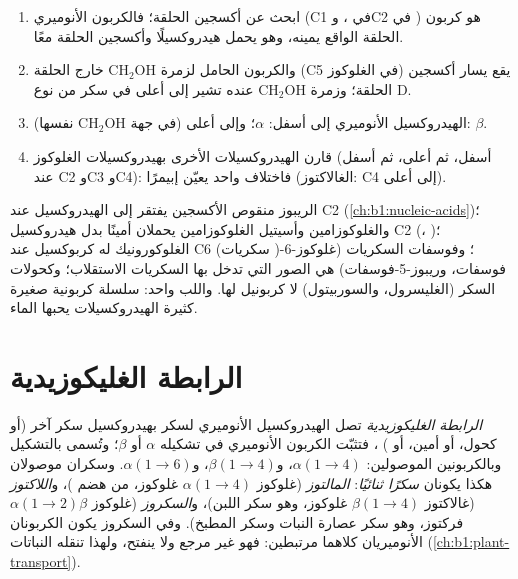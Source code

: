 \begin{method}\label{met:b1:carbohydrates:haworth}
\begin{enumerate}
  \item ابحث عن أكسجين الحلقة؛ فالكربون الأنوميري (C1 في ،
        وC2 في ) هو كربون الحلقة الواقع يمينه، وهو يحمل
        هيدروكسيلًا وأكسجين الحلقة معًا.
  \item والكربون الحامل لزمرة $\mathrm{CH_2OH}$ خارج الحلقة (C5 في
        الغلوكوز) يقع يسار أكسجين الحلقة؛ وزمرة $\mathrm{CH_2OH}$
        عنده تشير إلى أعلى في سكر من نوع D.
  \item الهيدروكسيل الأنوميري إلى أسفل: $\alpha$؛ وإلى أعلى (في جهة
        $\mathrm{CH_2OH}$ نفسها): $\beta$.
  \item قارن الهيدروكسيلات الأخرى بهيدروكسيلات الغلوكوز (أسفل، ثم
        أعلى، ثم أسفل عند C2 وC3 وC4): فاختلاف واحد يعيّن إبيمرًا
        (الغالاكتوز: C4 إلى أعلى).
\end{enumerate}
\end{method}

\begin{example}\label{ex:b1:carbohydrates:derivatives}
الريبوز منقوص الأكسجين يفتقر إلى الهيدروكسيل عند C2
(\cref{ch:b1:nucleic-acids})؛ والغلوكوزامين وأسيتيل الغلوكوزامين
يحملان أمينًا بدل هيدروكسيل C2 (، )؛ 
الغلوكورونيك له كربوكسيل عند C6 (سكريات )؛ وفوسفات
السكريات (غلوكوز-6-فوسفات، وريبوز-5-فوسفات) هي الصور التي تدخل بها
السكريات الاستقلاب؛ وكحولات السكر (الغليسرول، والسوربيتول) لا كربونيل
لها. واللب واحد: سلسلة كربونية صغيرة كثيرة الهيدروكسيلات يحبها الماء.
\end{example}

\section{الرابطة الغليكوزيدية}

\begin{definition}\label{def:b1:carbohydrates:glycosidic}
\emph{الرابطة الغليكوزيدية} تصل الهيدروكسيل
الأنوميري لسكر بهيدروكسيل سكر آخر (أو كحول، أو أمين، أو )
، فتثبّت الكربون الأنوميري في تشكيله $\alpha$ أو $\beta$؛
وتُسمى بالتشكيل وبالكربونين الموصولين: $\alpha(1{\to}4)$،
و$\beta(1{\to}4)$، و$\alpha(1{\to}6)$. وسكران موصولان هكذا يكونان
\emph{سكرًا ثنائيًا}: \emph{المالتوز} (غلوكوز
$\alpha(1{\to}4)$ غلوكوز، من هضم )، و\emph{اللاكتوز} (غالاكتوز
$\beta(1{\to}4)$ غلوكوز، وهو سكر اللبن)، و\emph{السكروز} (غلوكوز
$\alpha(1{\to}2)\beta$ فركتوز، وهو سكر عصارة النبات وسكر المطبخ). وفي
السكروز يكون الكربونان الأنوميريان كلاهما مرتبطين: فهو غير مرجع ولا
ينفتح، ولهذا تنقله النباتات (\cref{ch:b1:plant-transport}).
\end{definition}

